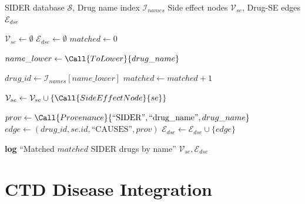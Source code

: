\documentclass[11pt,a4paper]{article}
\begin{document}
\begin{algorithm}[H]
\caption{IntegrateSIDER: Drug-Side Effect Associations}
\label{alg:sider}
\begin{algorithmic}[1]
\REQUIRE SIDER database $\mathcal{S}$, Drug name index $\mathcal{I}_{names}$
\ENSURE Side effect nodes $\mathcal{V}_{se}$, Drug-SE edges $\mathcal{E}_{dse}$

\STATE $\mathcal{V}_{se} \gets \emptyset$
\STATE $\mathcal{E}_{dse} \gets \emptyset$
\STATE $matched \gets 0$

    \STATE $name\_lower \gets \Call{ToLower}{drug\_name}$
    
        \STATE $drug\_id \gets \mathcal{I}_{names}[name\_lower]$
        \STATE $matched \gets matched + 1$
        
            \STATE {}
                \STATE $\mathcal{V}_{se} \gets \mathcal{V}_{se} \cup \{\Call{SideEffectNode}{se}\}$
            \ENDIF
            
            \STATE {}
            \STATE $prov \gets \Call{Provenance}{\text{``SIDER''}, \text{``drug\_name''}, drug\_name}$
            \STATE $edge \gets (drug\_id, se.id, \text{``CAUSES''}, prov)$
            \STATE $\mathcal{E}_{dse} \gets \mathcal{E}_{dse} \cup \{edge\}$
        \ENDFOR
    \ENDIF
\ENDFOR

\STATE \textbf{log} ``Matched $matched$ SIDER drugs by name''
\RETURN $\mathcal{V}_{se}, \mathcal{E}_{dse}$
\end{algorithmic}
\end{algorithm}

\newpage
\section{CTD Disease Integration}
\end{document}
